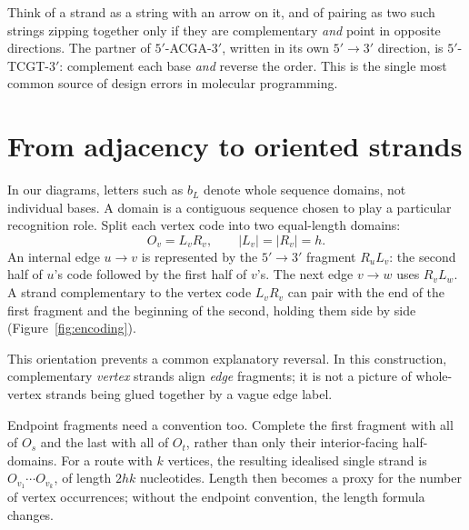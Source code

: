 \begin{BioBridge}
Think of a strand as a string with an arrow on it, and of pairing as
two such strings zipping together only if they are complementary \emph{and}
point in opposite directions. The partner of $5'$-ACGA-$3'$, written in its own
$5'\to3'$ direction, is $5'$-TCGT-$3'$: complement each base \emph{and} reverse
the order. This  is the single most common source of
design errors in molecular programming.
\end{BioBridge}

\section{From adjacency to oriented strands}\label{sec:encoding}
In our diagrams, letters such as $b_L$ denote whole sequence domains, not
individual bases. A domain is a contiguous sequence chosen to play a particular
recognition role. Split each vertex code into two equal-length domains:
\[
 O_v=L_vR_v,\qquad |L_v|=|R_v|=h .
\]
An internal edge $u\to v$ is represented by the $5'\to3'$ fragment $R_uL_v$:
the second half of $u$'s code followed by the first half of $v$'s. The next edge
$v\to w$ uses $R_vL_w$. A strand complementary to the vertex code $L_vR_v$ can
pair with the end of the first fragment and the beginning of the second, holding
them side by side (Figure~\ref{fig:encoding}).


This orientation prevents a common explanatory reversal. In this construction,
complementary \emph{vertex} strands align \emph{edge} fragments; it is not a
picture of whole-vertex strands being glued together by a vague edge label.

Endpoint fragments need a convention too. Complete the first fragment with all
of $O_s$ and the last with all of $O_t$, rather than only their interior-facing
half-domains. For a route with $k$ vertices, the resulting idealised single
strand is $O_{v_1}\cdots O_{v_k}$, of length $2hk$ nucleotides. Length then
becomes a proxy for the number of vertex occurrences; without the endpoint
convention, the length formula changes.

